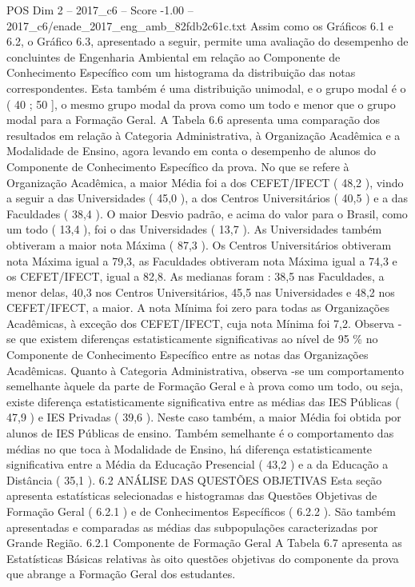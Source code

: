 \begin{textsample}{POS Dim 2 – 2017\_c6 – Score -1.00 – 2017\_c6/enade\_2017\_eng\_amb\_82fdb2c61c.txt}
Assim como os Gráficos 6.1 e 6.2, o Gráfico 6.3, apresentado a seguir, permite uma avaliação do desempenho de concluintes de Engenharia Ambiental em relação ao Componente de Conhecimento Específico com um histograma da distribuição das notas correspondentes.
Esta também é uma distribuição unimodal, e o grupo modal é o ( 40 ; 50 ], o mesmo grupo modal da prova como um todo e menor que o grupo modal para a Formação Geral.
A Tabela 6.6 apresenta uma comparação dos resultados em relação à Categoria Administrativa, à Organização Acadêmica e a Modalidade de Ensino, agora levando em conta o desempenho de alunos do Componente de Conhecimento Específico da prova.
No que se refere à Organização Acadêmica, a maior Média foi a dos CEFET/IFECT ( 48,2 ), vindo a seguir a das Universidades ( 45,0 ), a dos Centros Universitários ( 40,5 ) e a das Faculdades ( 38,4 ).
O maior Desvio padrão, e acima do valor para o Brasil, como um todo ( 13,4 ), foi o das Universidades ( 13,7 ).
As Universidades também obtiveram a maior nota Máxima ( 87,3 ).
Os Centros Universitários obtiveram nota Máxima igual a 79,3, as Faculdades obtiveram nota Máxima igual a 74,3 e os CEFET/IFECT, igual a 82,8.
As medianas foram : 38,5 nas Faculdades, a menor delas, 40,3 nos Centros Universitários, 45,5 nas Universidades e 48,2 nos CEFET/IFECT, a maior.
A nota Mínima foi zero para todas as Organizações Acadêmicas, à exceção dos CEFET/IFECT, cuja nota Mínima foi 7,2.
Observa -se que existem diferenças estatisticamente significativas ao nível de 95 \% no Componente de Conhecimento Específico entre as notas das Organizações Acadêmicas.
Quanto à Categoria Administrativa, observa -se um comportamento semelhante àquele da parte de Formação Geral e à prova como um todo, ou seja, existe diferença estatisticamente significativa entre as médias das IES Públicas ( 47,9 ) e IES Privadas ( 39,6 ).
Neste caso também, a maior Média foi obtida por alunos de IES Públicas de ensino.
Também semelhante é o comportamento das médias no que toca à Modalidade de Ensino, há diferença estatisticamente significativa entre a Média da Educação Presencial ( 43,2 ) e a da Educação a Distância ( 35,1 ). 6.2 ANÁLISE DAS QUESTÕES OBJETIVAS Esta seção apresenta estatísticas selecionadas e histogramas das Questões Objetivas de Formação Geral ( 6.2.1 ) e de Conhecimentos Específicos ( 6.2.2 ).
São também apresentadas e comparadas as médias das subpopulações caracterizadas por Grande Região. 6.2.1 Componente de Formação Geral A Tabela 6.7 apresenta as Estatísticas Básicas relativas às oito questões objetivas do componente da prova que abrange a Formação Geral dos estudantes.

\end{textsample}
